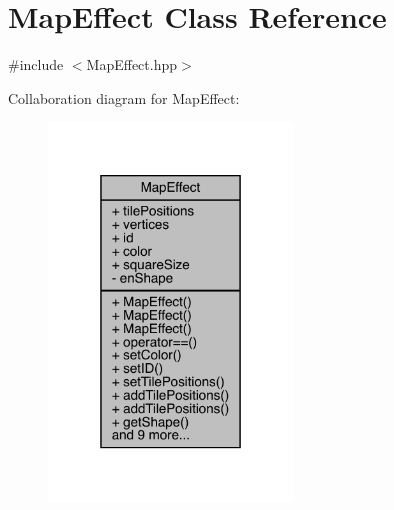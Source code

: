 \hypertarget{class_map_effect}{}\section{Map\+Effect Class Reference}
\label{class_map_effect}


{\ttfamily \#include $<$Map\+Effect.\+hpp$>$}



Collaboration diagram for Map\+Effect\+:
\nopagebreak
\begin{figure}[H]
\begin{center}
\leavevmode
\includegraphics[width=184pt]{class_map_effect__coll__graph}
\end{center}
\end{figure}
